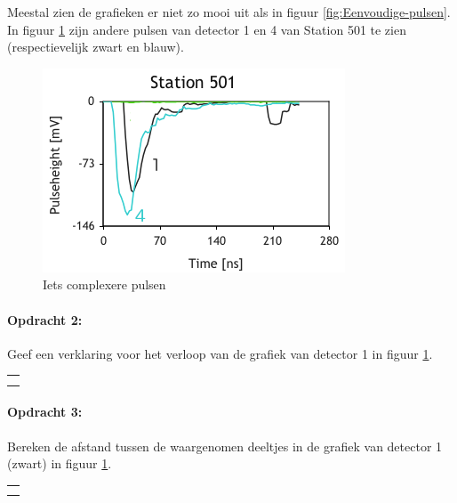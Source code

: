 \bigskip{}


Meestal zien de grafieken er niet zo mooi uit als in figuur \ref{fig:Eenvoudige-pulsen}.
In figuur \ref{fig:Iets-complexere-pulsen} zijn andere pulsen van detector
1 en 4 van Station 501 te zien (respectievelijk zwart en blauw).

\begin{figure}[h]
\noindent \begin{centering}
\includegraphics[scale=0.65]{Figures/Traces501}
\par\end{centering}

\caption{\label{fig:Iets-complexere-pulsen}Iets complexere pulsen}
\end{figure}


\begin{minipage}[t]{1\columnwidth}%

\paragraph{Opdracht 2:}

Geef een verklaring voor het verloop van de grafiek van detector
1 in figuur \ref{fig:Iets-complexere-pulsen}.

\begin{tabular}{>{\raggedright}p{16.6cm}}
\tabularnewline
\hline 
\tabularnewline
\hline 
\tabularnewline
\hline 
\tabularnewline
\hline 
\end{tabular}%
\end{minipage}

\bigskip{}


\begin{minipage}[t]{1\columnwidth}%

\paragraph{Opdracht 3:}

Bereken de afstand tussen de waargenomen deeltjes in de grafiek
van detector 1 (zwart) in figuur \ref{fig:Iets-complexere-pulsen}.

\begin{tabular}{>{\raggedright}p{16.6cm}}
\tabularnewline
\hline 
\tabularnewline
\hline 
\tabularnewline
\hline 
\tabularnewline
\hline 
\end{tabular}%
\end{minipage}


